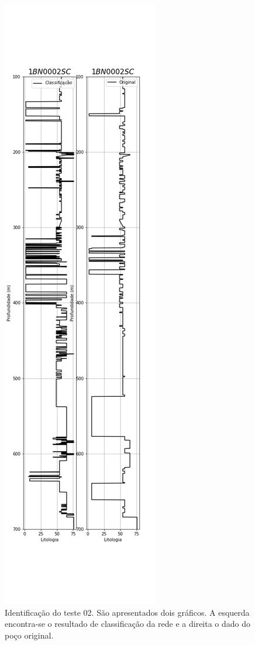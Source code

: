 \begin{figure}[H]
	\centering
		\includegraphics[scale=0.4]{Imagens/result02.png}
	\caption{Identificação do teste 02. São apresentados dois gráficos. A esquerda encontra-se o resultado de classificação da rede e a direita o dado do poço original.}
	\label{IDt02}
\end{figure} 

